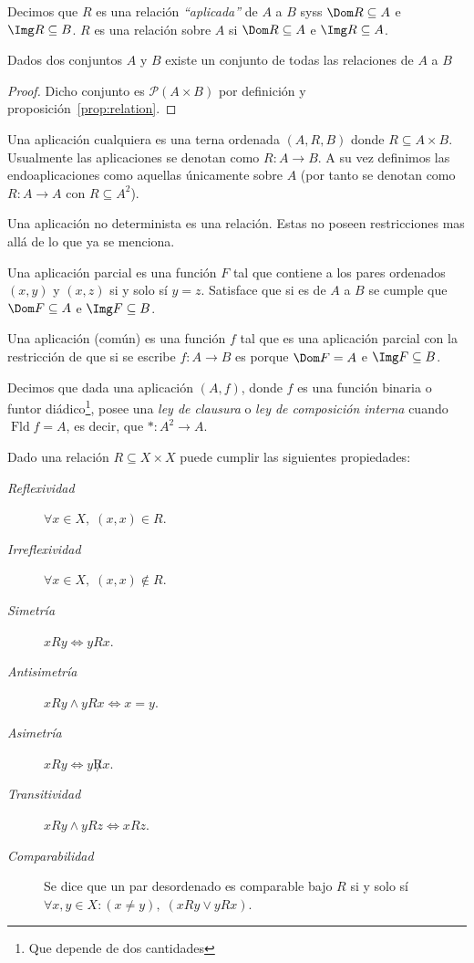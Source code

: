 \documentclass[11pt,oneside,a4paper]{book}
\renewcommand{\P}{\mathcal{P}}
\DeclareMathOperator{\Fld}{Fld}
\begin{document}
\begin{mydef}[Relación]
Decimos que $R$ es una relación \textit{``aplicada''} de $A$ a $B$ syss $\Dom R\subseteq A$ e $\Img R\subseteq B$. $R$ es una relación sobre $A$ si $\Dom R\subseteq A$ e $\Img R\subseteq A$.
\end{mydef}
\begin{cor}
Dados dos conjuntos $A$ y $B$ existe un conjunto de todas las relaciones de $A$ a $B$
\end{cor}
\begin{proof}
Dicho conjunto es $\P(A\times B)$ por definición y proposición~\ref{prop:relation}.
\end{proof}
\begin{mydef}[Aplicaciones]
Una aplicación cualquiera es una terna ordenada $(A,R,B)$ donde $R\subseteq A\times B$. Usualmente las aplicaciones se denotan como $R:A\rightarrow B$. A su vez definimos las endoaplicaciones como aquellas únicamente sobre $A$ (por tanto se denotan como $R:A\rightarrow A$ con $R\subseteq A^2$).

Una aplicación no determinista es una relación. Estas no poseen restricciones mas allá de lo que ya se menciona.

Una aplicación parcial es una función $F$ tal que contiene a los pares ordenados $(x,y)$ y $(x,z)$ si y solo sí $y=z$. Satisface que si es de $A$ a $B$ se cumple que $\Dom F\subseteq A$ e $\Img F\subseteq B$.

Una aplicación (común) es una función $f$ tal que es una aplicación parcial con la restricción de que si se escribe $f:A\rightarrow B$ es porque $\Dom F=A$ e $\Img F\subseteq B$.
\end{mydef}
Decimos que dada una aplicación $(A,f)$, donde $f$ es una función binaria o funtor diádico\footnote{Que depende de dos cantidades}, posee una \textit{ley de clausura} o \textit{ley de composición interna} cuando $\Fld f=A$, es decir, que $*:A^2\rightarrow A$.
\begin{mydef}
Dado una relación $R\subseteq X\times X$ puede cumplir las siguientes propiedades:
\begin{description}
\item[\it Reflexividad] $\forall x\in X,\;(x,x)\in R$.
\item[\it Irreflexividad] $\forall x\in X,\;(x,x)\notin R$.
\item[\it Simetría] $xRy\iff yRx$.
\item[\it Antisimetría] $xRy\wedge yRx\iff x=y$.
\item[\it Asimetría] $xRy\iff y\not Rx$.
\item[\it Transitividad] $xRy\wedge yRz\iff xRz$.
\item[\it Comparabilidad] Se dice que un par desordenado es comparable bajo $R$ si y solo sí $\forall x,y\in X:(x\neq y),\;(xRy\vee yRx)$.
\end{description}
\end{mydef}
\end{document}
